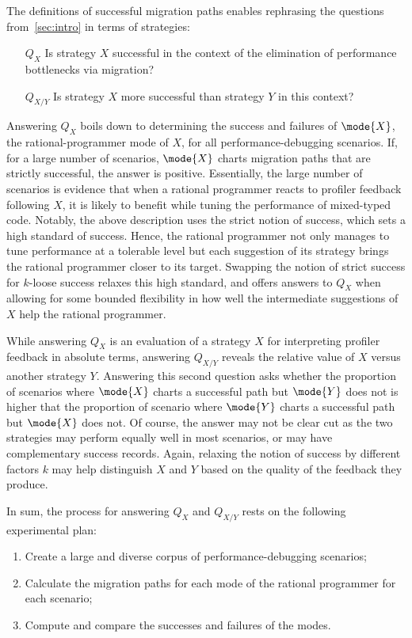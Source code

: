 
The definitions of successful migration paths enables rephrasing the
questions from~\ref{sec:intro} in terms of strategies:
\begin{itemize}
\item[$Q_X$] Is strategy $X$ successful in the context of the elimination of
  performance bottlenecks via migration?

\item[$Q_{X/Y}$] Is strategy $X$ more successful than strategy $Y$ in this
  context?
\end{itemize}

Answering $Q_X$ boils down to determining the success and failures of
$\mode{X}$, the rational-programmer mode of $X$, for all
performance-debugging scenarios. If, for a large number of scenarios,
$\mode{X}$ charts migration paths that are strictly successful, the answer
is positive. Essentially, the large number of scenarios is evidence that
when a rational programmer reacts to profiler feedback following $X$, it is
likely to benefit  while tuning the performance of 
mixed-typed code. Notably, the above description uses the strict notion of
success, which sets a high standard of success. Hence, the rational
programmer not only manages to tune performance at a tolerable level but
each suggestion of its strategy brings the rational programmer closer to
its target. Swapping the notion of strict success for $k$-loose success
relaxes this high standard, and offers answers to $Q_X$ when allowing for
some bounded flexibility in how well the intermediate suggestions of
$X$ help the rational programmer.   

While answering $Q_X$ is an evaluation of a strategy $X$ for interpreting
profiler feedback in absolute terms, answering $Q_{X/Y}$ reveals the
relative value of $X$ versus another strategy $Y$. Answering this second
question asks whether the proportion of scenarios where $\mode{X}$ charts a
successful path but  $\mode{Y}$ does not is higher that the proportion of
scenario where  $\mode{Y}$ charts a successful path but $\mode{X}$ does not.
Of course, the answer may not be clear cut as the two strategies may
perform equally well in most scenarios, or may have complementary success 
records. Again, relaxing the notion of success by different factors $k$
may help distinguish  $X$ and $Y$ based on the quality of the feedback
they produce. 

In sum, the process for answering $Q_X$ and $Q_{X/Y}$ rests on the
following experimental plan:
\begin{enumerate}
\item Create a large and diverse corpus of performance-debugging scenarios;
\item Calculate the migration paths for each mode of the rational
  programmer for each scenario;
\item Compute and compare the successes and failures of the modes.  
\end{enumerate}


